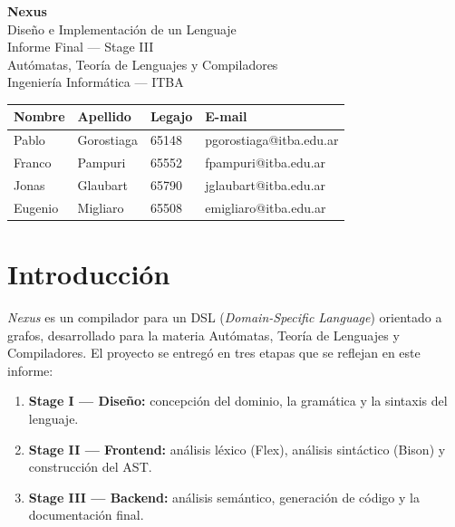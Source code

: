 \documentclass[11pt,a4paper]{article}
\begin{document}
\begin{center}
  {\Huge\bfseries Nexus}\\[0.4em]
  {\Large Diseño e Implementación de un Lenguaje}\\[0.8em]
  {\large Informe Final --- Stage III}\\[0.6em]
  Autómatas, Teoría de Lenguajes y Compiladores\\
  Ingeniería Informática --- ITBA
\end{center}
\vspace{1em}

\begin{center}
\begin{tabular}{@{}llll@{}}
\toprule
\textbf{Nombre} & \textbf{Apellido} & \textbf{Legajo} & \textbf{E-mail} \\
\midrule
Pablo   & Gorostiaga & 65148 & pgorostiaga@itba.edu.ar \\
Franco  & Pampuri    & 65552 & fpampuri@itba.edu.ar \\
Jonas   & Glaubart   & 65790 & jglaubart@itba.edu.ar \\
Eugenio & Migliaro   & 65508 & emigliaro@itba.edu.ar \\
\bottomrule
\end{tabular}
\end{center}
\vspace{1.5em}

\tableofcontents
\newpage

\section{Introducción}

\emph{Nexus} es un compilador para un DSL (\emph{Domain-Specific Language})
orientado a grafos, desarrollado para la materia Autómatas, Teoría de Lenguajes
y Compiladores. El proyecto se entregó en tres etapas que se reflejan en este
informe:

\begin{enumerate}[noitemsep]
  \item \textbf{Stage I --- Diseño:} concepción del dominio, la gramática y la
        sintaxis del lenguaje.
  \item \textbf{Stage II --- Frontend:} análisis léxico (Flex), análisis
        sintáctico (Bison) y construcción del AST.
  \item \textbf{Stage III --- Backend:} análisis semántico, generación de
        código y la documentación final.
\end{enumerate}
\end{document}
